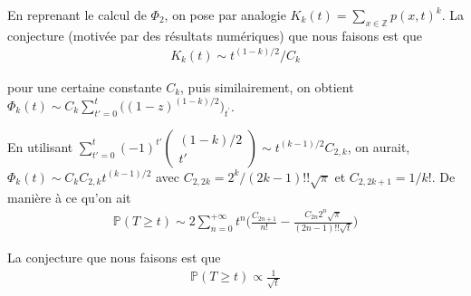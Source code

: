 \documentclass{article}
\newtheorem{theorem}{Théorème}[section]
\theoremstyle{definition}
\begin{document}
En reprenant le calcul de $\Phi_2$, on pose par analogie $K_k(t) = \sum_{x\in\mathbb{Z}}p(x,t)^k$. La conjecture (motivée par des résultats numériques) que nous faisons est que
\begin{align*}
	K_k(t) \sim t^{(1-k)/2}/C_k
\end{align*}

pour une certaine constante $C_k$, puis similairement, on obtient $\Phi_k(t) \sim C_k\sum_{t'=0}^t \bigg((1-z)^{(1-k)/2}\bigg)_{t^'}$.

En utilisant $\sum_{t'=0}^t (-1)^{t'}\begin{pmatrix}(1-k)/2\\t'\end{pmatrix} \sim t^{(k-1)/2}C_{2, k}$, on aurait, $\Phi_k(t) \sim C_k C_{2,k}t^{(k-1)/2}$ avec $C_{2, 2k} = 2^k/(2k-1)!!\sqrt{\pi}$ et $C_{2,2k+1}=1/k!$. De manière à ce qu'on ait
\begin{align*}
	\mathds{P}(T\geq t) \sim 2\sum_{n=0}^{+\infty} t^n\bigg(\frac{C_{2n+1}}{n!} - \frac{C_{2n}2^n\sqrt{\pi}}{(2n-1)!!\sqrt{t}}\bigg)
\end{align*}

La conjecture que nous faisons est que
\begin{align*}
	\mathds{P}(T\geq t)\propto \frac{1}{\sqrt{t}}
\end{align*}





%
\end{document}
